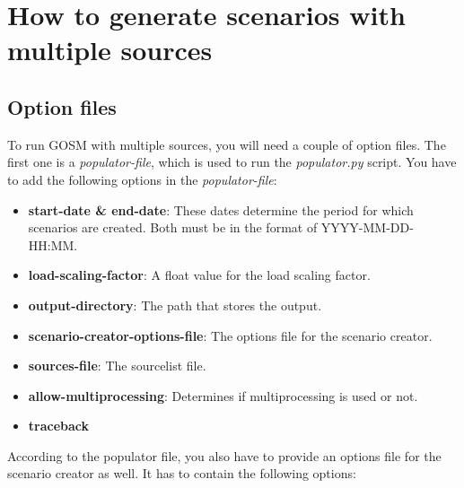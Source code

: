 \section{How to generate scenarios with multiple sources}

\subsection{Option files}

To run GOSM with multiple sources, you will need a couple of option files. The first one is a \emph{populator-file}, which is used to run the \emph{populator.py} script. You have to add the following options in the \emph{populator-file}:

\begin{itemize}
	\item \textbf{start-date \& end-date}: These dates determine the period for which scenarios are created. Both must be in the format of YYYY-MM-DD-HH:MM.
	\item \textbf{load-scaling-factor}: A float value for the load scaling factor.
	\item \textbf{output-directory}: The path that stores the output.
	\item \textbf{scenario-creator-options-file}: The options file for the scenario creator.
	\item \textbf{sources-file}: The sourcelist file.
	\item \textbf{allow-multiprocessing}: Determines if multiprocessing is used or not.
	\item \textbf{traceback}
\end{itemize}

According to the populator file, you also have to provide an options file for the scenario creator as well. It has to contain the following options:

